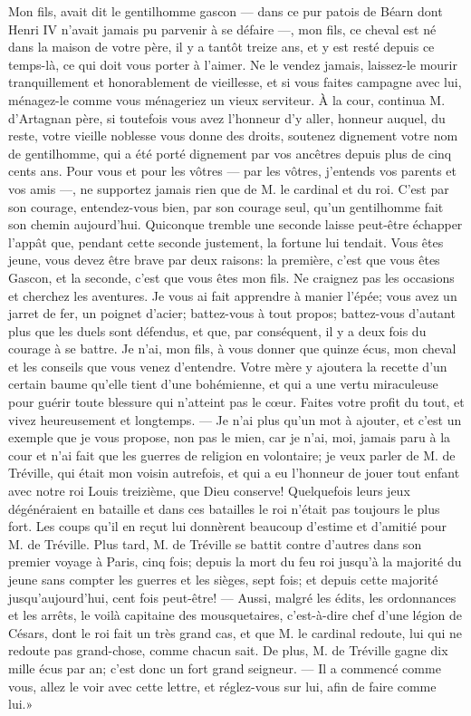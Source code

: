 \speak  Mon fils, avait dit le gentilhomme gascon --- dans ce pur patois de Béarn dont Henri IV n'avait jamais pu parvenir à se défaire ---, mon fils, ce cheval est né dans la maison de votre père, il y a tantôt treize ans, et y est resté depuis ce temps-là, ce qui doit vous porter à l'aimer. Ne le vendez jamais, laissez-le mourir tranquillement et honorablement de vieillesse, et si vous faites campagne avec lui, ménagez-le comme vous ménageriez un vieux serviteur. À la cour, continua M. d'Artagnan père, si toutefois vous avez l'honneur d'y aller, honneur auquel, du reste, votre vieille noblesse vous donne des droits, soutenez dignement votre nom de gentilhomme, qui a été porté dignement par vos ancêtres depuis plus de cinq cents ans. Pour vous et pour les vôtres --- par les vôtres, j'entends vos parents et vos amis ---, ne supportez jamais rien que de M. le cardinal et du roi. C'est par son courage, entendez-vous bien, par son courage seul, qu'un gentilhomme fait son chemin aujourd'hui. Quiconque tremble une seconde laisse peut-être échapper l'appât que, pendant cette seconde justement, la fortune lui tendait. Vous êtes jeune, vous devez être brave par deux raisons: la première, c'est que vous êtes Gascon, et la seconde, c'est que vous êtes mon fils. Ne craignez pas les occasions et cherchez les aventures. Je vous ai fait apprendre à manier l'épée; vous avez un jarret de fer, un poignet d'acier; battez-vous à tout propos; battez-vous d'autant plus que les duels sont défendus, et que, par conséquent, il y a deux fois du courage à se battre. Je n'ai, mon fils, à vous donner que quinze écus, mon cheval et les conseils que vous venez d'entendre. Votre mère y ajoutera la recette d'un certain baume qu'elle tient d'une bohémienne, et qui a une vertu miraculeuse pour guérir toute blessure qui n'atteint pas le cœur. Faites votre profit du tout, et vivez heureusement et longtemps. --- Je n'ai plus qu'un mot à ajouter, et c'est un exemple que je vous propose, non pas le mien, car je n'ai, moi, jamais paru à la cour et n'ai fait que les guerres de religion en volontaire; je veux parler de M. de Tréville, qui était mon voisin autrefois, et qui a eu l'honneur de jouer tout enfant avec notre roi Louis treizième, que Dieu conserve! Quelquefois leurs jeux dégénéraient en bataille et dans ces batailles le roi n'était pas toujours le plus fort. Les coups qu'il en reçut lui donnèrent beaucoup d'estime et d'amitié pour M. de Tréville. Plus tard, M. de Tréville se battit contre d'autres dans son premier voyage à Paris, cinq fois; depuis la mort du feu roi jusqu'à la majorité du jeune sans compter les guerres et les sièges, sept fois; et depuis cette majorité jusqu'aujourd'hui, cent fois peut-être! --- Aussi, malgré les édits, les ordonnances et les arrêts, le voilà capitaine des mousquetaires, c'est-à-dire chef d'une légion de Césars, dont le roi fait un très grand cas, et que M. le cardinal redoute, lui qui ne redoute pas grand-chose, comme chacun sait. De plus, M. de Tréville gagne dix mille écus par an; c'est donc un fort grand seigneur. --- Il a commencé comme vous, allez le voir avec cette lettre, et réglez-vous sur lui, afin de faire comme lui.» 

